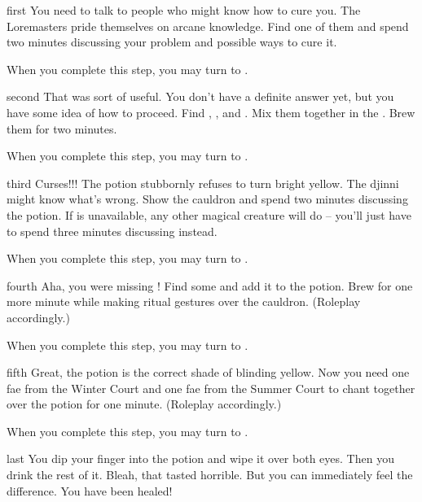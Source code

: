 \documentclass[notebook]{guildcamp2} %
\begin{document}
\startnotebook{\nStoneGaze{}}

\begin{page}{first}
You need to talk to people who might know how to cure you.  The Loremasters pride themselves on arcane knowledge.  Find one of them and spend two minutes discussing your problem and possible ways to cure it.

When you complete this step, you may turn to .
\end{page}


\begin{page}{second}
That was sort of useful.  You don't have a definite answer yet, but you have some idea of how to proceed.    Find \iEyebright{}, \iGingko{}, and \iBilberries{}.  Mix them together in the \sCauldron{}.  Brew them for two minutes.

When you complete this step, you may turn to .
\end{page}


\begin{page}{third}
Curses!!!  The potion stubbornly refuses to turn bright yellow.  The djinni \cWizard{} might know what's wrong.  Show \cWizard{\them} the cauldron and spend two minutes discussing the potion.  If \cWizard{} is unavailable, any other magical creature will do -- you'll just have to spend three minutes discussing instead.

When you complete this step, you may turn to .
\end{page}


\begin{page}{fourth}
Aha, you were missing \iForsythia{}!  Find some and add it to the potion.  Brew for one more minute while making ritual gestures over the cauldron.  (Roleplay accordingly.)

When you complete this step, you may turn to .
\end{page}


\begin{page}{fifth}
Great, the potion is the correct shade of blinding yellow.  Now you need one fae from the Winter Court and one fae from the Summer Court to chant together over the potion for one minute.  (Roleplay accordingly.)

When you complete this step, you may turn to .
\end{page}

\begin{page}{last}
You dip your finger into the potion and wipe it over both eyes.  Then you drink the rest of it.  Bleah, that tasted horrible.  But you can immediately feel the difference.  You have been healed!  
\end{page}

\endnotebook
\end{document}
